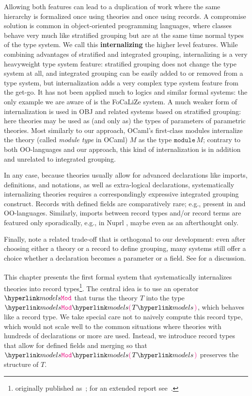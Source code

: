 Allowing both features can lead to a duplication of work where the same hierarchy is formalized once using theories and once using records.
A compromise solution is common in object-oriented programming languages, where classes behave very much like stratified grouping but are at the same time normal types of the type system.
We call this \textbf{internalizing} the higher level features.
While combining advantages of stratified and integrated grouping, internalizing is a very heavyweight type system feature: stratified grouping does not change the type system at all, and integrated grouping can be easily added to or removed from a type system, but internalization adds a very complex type system feature from the get-go.
It has not been applied much to logics and similar formal systems: the only example we are aware of is the FoCaLiZe \cite{focalize} system.%
A much weaker form of internalization is used in OBJ and related systems based on stratified grouping: here theories may be used as (and only as) the types of parameters of parametric theories.
Most similarly to our approach, OCaml's first-class modules internalize the theory (called \emph{module type} in OCaml) $M$ as the type $\mathtt{module}\,M$; contrary to both OO-languages and our approach, this kind of internalization is in addition and unrelated to integrated grouping.

In any case, because theories usually allow for advanced declarations like imports, definitions, and notations, as well as extra-logical declarations, systematically internalizing theories requires a correspondingly expressive integrated grouping construct.
Records with defined fields are comparatively rare; e.g., present in \cite{luo:manifestfields} and OO-languages.
Similarly, imports between record types and/or record terms are featured only sporadically, e.g., in Nuprl \cite{nuprl}, maybe even as an afterthought only.

Finally, note a related trade-off that is orthogonal to our development: even after choosing either a theory or a record to define grouping, many systems still offer a choice whether a declaration becomes a parameter or a field.
See \cite{spitters_classes} for a discussion.


\paragraph{}%
This chapter presents the first formal system that systematically internalizes theories into record types\footnote{originally published as~\cite{MueRabKoh:tat18}; for an extended report see~\cite{MueRabKoh:tatreport18}.}.
The central idea is to use an operator $\modelsofF$ that turns the theory $T$ into the type $\modelsof T$, which behaves like a record type.
We take special care not to naively compute this record type, which would not scale well to the common situations where theories with hundreds of declarations or more are used.
Instead, we introduce record types that allow for defined fields and merging so that $\modelsof T$ preserves the structure of $T$.

